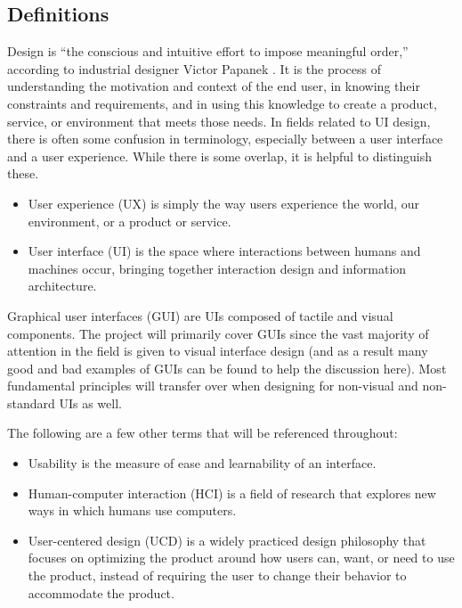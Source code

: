 \documentclass[12pt, oneside]{article}
\begin{document}
\subsection{Definitions}

Design is ``the conscious and intuitive effort to impose meaningful order,'' according to industrial designer Victor Papanek \cite[p.~12]{cooper_reimann_cronin_2014}. It is the process of understanding the motivation and context of the end user, in knowing their constraints and requirements, and in using this knowledge to create a product, service, or environment that meets those needs. In fields related to UI design, there is often some confusion in terminology, especially between a user interface and a user experience. While there is some overlap, it is helpful to distinguish these.

\begin{itemize}
\raggedright
    \item User experience (UX) is simply the way users experience the world, our environment, or a product or service.
    \item User interface (UI) is the space where interactions between humans and machines occur, bringing together interaction design and information architecture.
\end{itemize}

Graphical user interfaces (GUI) are UIs composed of tactile and visual components. The project will primarily cover GUIs since the vast majority of attention in the field is given to visual interface design (and as a result many good and bad examples of GUIs can be found to help the discussion here). Most fundamental principles will transfer over when designing for non-visual and non-standard UIs as well.

The following are a few other terms that will be referenced throughout:

\begin{itemize}
\raggedright
    \item Usability is the measure of ease and learnability of an interface.
    \item Human-computer interaction (HCI) is a field of research that explores new ways in which humans use computers.
    \item User-centered design (UCD) is a widely practiced design philosophy that focuses on optimizing the product around how users can, want, or need to use the product, instead of requiring the user to change their behavior to accommodate the product.
\end{itemize}
\end{document}
